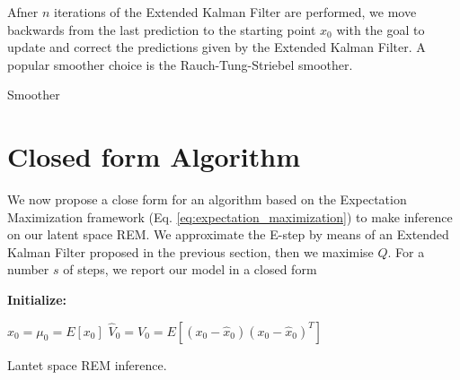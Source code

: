 \documentclass[mscthesis]{usiinfthesis}
\begin{document}
Afner $n$ iterations of the Extended Kalman Filter are performed, we move backwards from the last prediction to the starting point $x_0$ with the goal to update and correct the predictions given by the Extended Kalman Filter. A popular smoother choice  is the Rauch-Tung-Striebel smoother. 

\begin{algorithm}[H]
  \caption{Smoother}
  \label{algo:smoother}
\end{algorithm}

\section{Closed form Algorithm}
We now propose a close form for an algorithm based on the Expectation Maximization framework (Eq. \ref{eq:expectation_maximization}) to make inference on our latent space REM. We approximate the E-step by means of an Extended Kalman Filter proposed in the previous section, then we maximise $Q$. For a number $s$ of steps, we report our model in a closed form


\begin{algorithm}[H]

\textbf{Initialize: }
\begin{substeps}
$\hat{x}_0 = \mu_0 = E[x_0]$ \;
$\hat{V}_0 = V_0 = E[(x_0-\hat{x}_0)(x_0-\hat{x}_0)^T]$  \;
\end{substeps}
\caption{Lantet space REM inference.}
\label{algo:rem_latent}
\end{algorithm}



\end{document}

